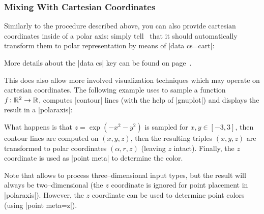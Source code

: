 {\subsubsection{Mixing With Cartesian Coordinates}
\label{sec:polar:cart}
Similarly to the procedure described above, you can also provide cartesian coordinates inside of a polar axis: simply tell \PGFPlots\ that it should automatically transform them to polar representation by means of |data cs=cart|:
\begin{codeexample}[]
\end{codeexample}
\noindent More details about the |data cs| key can be found on page~\pageref{key:data:cs}.

This does also allow more involved visualization techniques which may operate on cartesian coordinates. The following example uses  to sample a function $f\colon \mathbb{R}^2 \to \mathbb{R}$, computes |contour| lines (with the help of |gnuplot|) and displays the result in a |polaraxis|:
\pgfplotsexpensiveexample
\begin{codeexample}[]
\end{codeexample}
\noindent What happens is that $z=\exp(-x^2-y^2)$ is sampled for $x,y \in [-3,3]$, then contour lines are computed on $(x,y,z)$, then the resulting triples $(x,y,z)$ are transformed to polar coordinates $(\alpha,r,z)$ (leaving $z$ intact). Finally, the $z$ coordinate is used as |point meta| to determine the color.

Note that  allows to process three--dimensional input types, but the result will always be two--dimensional (the $z$ coordinate is ignored for point placement in |polaraxis|). However, the $z$ coordinate can be used to determine point colors (using |point meta=z|).

}
